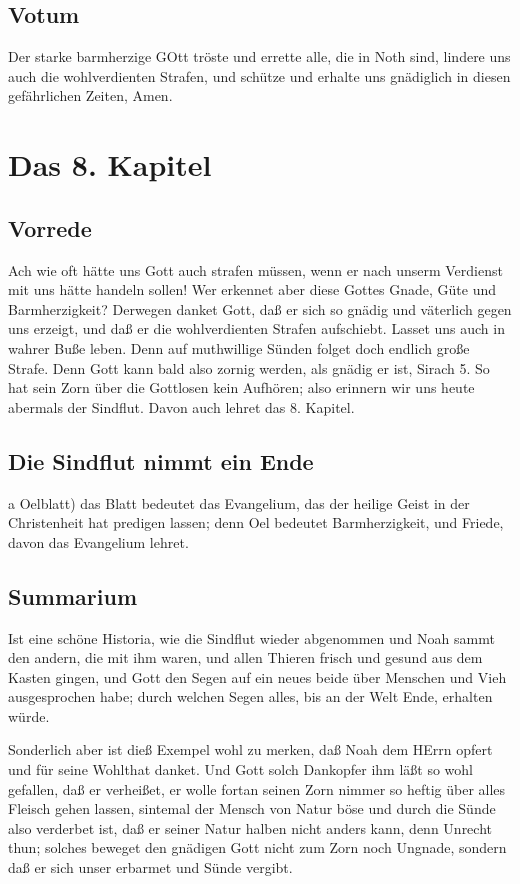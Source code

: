 \section{Votum}

Der starke barmherzige GOtt tröste und errette alle, die in Noth sind, lindere uns auch die wohlverdienten Strafen, und schütze und erhalte uns gnädiglich in diesen gefährlichen Zeiten, Amen.

\chapter{Das 8. Kapitel}

\section{Vorrede}

Ach wie oft hätte uns Gott auch strafen müssen, wenn er nach unserm Verdienst mit uns hätte handeln sollen! Wer erkennet aber diese Gottes Gnade, Güte und Barmherzigkeit? Derwegen danket Gott, daß er sich so gnädig und väterlich gegen uns erzeigt, und daß er die wohlverdienten Strafen aufschiebt. Lasset uns auch in wahrer Buße leben. Denn auf muthwillige Sünden folget doch endlich große Strafe. Denn Gott kann bald also zornig werden, als gnädig er ist, Sirach 5. So hat sein Zorn über die Gottlosen kein Aufhören; also erinnern wir uns heute abermals der Sindflut. Davon auch lehret das 8. Kapitel.

\section{Die Sindflut nimmt ein Ende}

a Oelblatt) das Blatt bedeutet das Evangelium, das der heilige Geist in der Christenheit hat predigen lassen; denn Oel bedeutet Barmherzigkeit, und Friede, davon das Evangelium lehret.

\section{Summarium}

Ist eine schöne Historia, wie die Sindflut wieder abgenommen und Noah sammt den andern, die mit ihm waren, und allen Thieren frisch und gesund aus dem Kasten gingen, und Gott den Segen auf ein neues beide über Menschen und Vieh ausgesprochen habe; durch welchen Segen alles, bis an der Welt Ende, erhalten würde.

Sonderlich aber ist dieß Exempel wohl zu merken, daß Noah dem HErrn opfert und für seine Wohlthat danket. Und Gott solch Dankopfer ihm läßt so wohl gefallen, daß er verheißet, er wolle fortan seinen Zorn nimmer so heftig über alles Fleisch gehen lassen, sintemal der Mensch von Natur böse und durch die Sünde also verderbet ist, daß er seiner Natur halben nicht anders kann, denn Unrecht thun; solches beweget den gnädigen Gott nicht zum Zorn noch Ungnade, sondern daß er sich unser erbarmet und Sünde vergibt.

